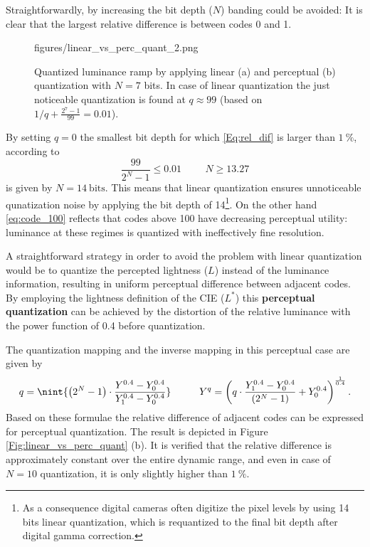 Straightforwardly, by increasing the bit depth ($N$) banding could be avoided:
It is clear that the largest relative difference is between codes 0 and 1.
%
\begin{figure}[]
	\centering
	\begin{overpic}[width = 0.8\columnwidth ]{figures/linear_vs_perc_quant_2.png}
	\end{overpic}
	\caption{Quantized luminance ramp by applying linear (a) and perceptual (b) quantization with $N=7$ bits.
	In case of linear quantization the just noticeable quantization is found at $q \approx 99$ (based on $1 / q + \frac{2^7 - 1}{99} = 0.01$).}
	\label{Fig:linear_vs_perc_quant_2}
\end{figure}
%
By setting $q = 0$ the smallest bit depth for which \eqref{Eq:rel_dif} is larger than $1~\%$, according to
\begin{equation}
\frac{99}{2^N - 1} \leq 0.01 \hspace{1cm} N \geq 13.27 
\end{equation}
is given by $N = 14~\mathrm{bits}$.
This means that linear quantization ensures unnoticeable qunatization noise by applying the bit depth of 14\footnote{
As a consequence digital cameras often digitize the pixel levels by using 14 bits linear quantization, which is requantized to the final bit depth after digital gamma correction.}.
On the other hand \eqref{eq:code_100} reflects that codes above 100 have decreasing perceptual utility: luminance at these regimes is quantized with ineffectively fine resolution.

\vspace{3mm}
A straightforward strategy in order to avoid the problem with linear quantization would be to quantize the percepted lightness ($L$) instead of the luminance information, resulting in uniform perceptual difference between adjacent codes.
By employing the lightness definition of the CIE ($L^*$) this \textbf{perceptual quantization} can be achieved by the distortion of the relative luminance with the power function of 0.4 before quantization.

The quantization mapping and the inverse mapping in this perceptual case are given by
\begin{equation}
q =  \nint{ \left( 2^N - 1 \right) \cdot  \frac{Y^{0.4} - Y_0^{0.4} }{Y_1^{0.4} - Y_0^{0.4}} }
\hspace{1cm}
Y^q = \left( q \cdot \frac{Y_1^{0.4} - Y_0^{0.4}}{\left( 2^N - 1 \right) } + Y_0^{0.4} \right)^{\frac{1}{0.4}} .
\end{equation}
Based on these formulae the relative difference of adjacent codes can be expressed for perceptual quantization.
The result is depicted in Figure \ref{Fig:linear_vs_perc_quant} (b).
It is verified that the relative difference is approximately constant over the entire dynamic range, and even in case of $N = 10$ quantization, it is only slightly higher than $1~\%$.


